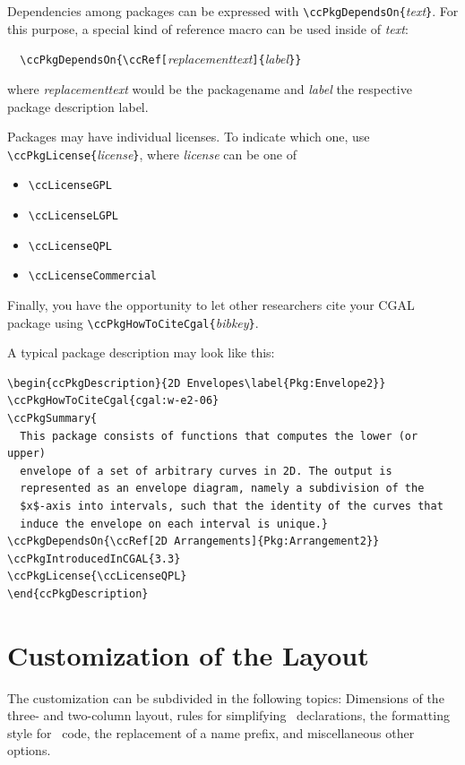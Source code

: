 \documentclass[11pt]{article}
\begin{document}
Dependencies among packages can be expressed with
\verb+\ccPkgDependsOn{+{\em text}\verb+}+. For this purpose, a special
kind of reference macro can be used inside of {\em text}:

\verb+  \ccPkgDependsOn{\ccRef[+{\em replacementtext}\verb+]{+{\em label}\verb+}}+

where {\em replacementtext} would be the packagename and {\em label} the
respective package description label.

Packages may have individual licenses. To indicate which one, use
\verb+\ccPkgLicense{+{\em license}\verb+}+, where {\em license} can be one of

\begin{itemize}
 \item \verb+\ccLicenseGPL+
 \item \verb+\ccLicenseLGPL+
 \item \verb+\ccLicenseQPL+
 \item \verb+\ccLicenseCommercial+
\end{itemize}

Finally, you have the opportunity to let other researchers cite your CGAL package using
\verb+\ccPkgHowToCiteCgal{+{\em bibkey}\verb+}+.

A typical package description may look like this:

\begin{verbatim}
\begin{ccPkgDescription}{2D Envelopes\label{Pkg:Envelope2}}
\ccPkgHowToCiteCgal{cgal:w-e2-06}
\ccPkgSummary{
  This package consists of functions that computes the lower (or upper)
  envelope of a set of arbitrary curves in 2D. The output is
  represented as an envelope diagram, namely a subdivision of the
  $x$-axis into intervals, such that the identity of the curves that
  induce the envelope on each interval is unique.}
\ccPkgDependsOn{\ccRef[2D Arrangements]{Pkg:Arrangement2}}
\ccPkgIntroducedInCGAL{3.3}
\ccPkgLicense{\ccLicenseQPL}
\end{ccPkgDescription}
\end{verbatim}


\section{Customization of the Layout}
\label{sectionCustomize}


The customization can be subdivided in the following topics:
Dimensions of the three- and two-column layout, rules for simplifying
\CC\ declarations, the formatting style for \CC\ code, the replacement
of a name prefix, and miscellaneous other options.
\end{document}
